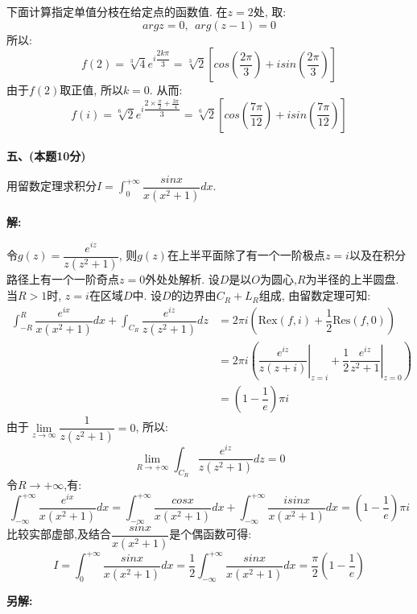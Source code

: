 \documentclass{article}
\begin{document}
下面计算指定单值分枝在给定点的函数值. 在$z=2$处, 取:
$$ argz = 0, \ \ arg(z-1) = 0 $$
所以:
$$ f(2) = \sqrt[3]{4} e^{i\dfrac{2k\pi}{3}} = \sqrt[3]{2}\left[cos(\dfrac{2\pi}{3}) + isin(\dfrac{2\pi}{3}) \right] $$
由于$f(2)$取正值, 所以$k=0$. 从而:
$$ f(i) = \sqrt[6]{2} e^{i\dfrac{2\times \frac{\pi}{2} + \frac{3\pi}{4}}{3}} = \sqrt[6]{2}\left[cos(\dfrac{7\pi}{12}) + isin(\dfrac{7\pi}{12})  \right] $$ \\ 


\textbf{五、(本题10分)}

用留数定理求积分$I = \displaystyle{\int_0^{+\infty} \dfrac{sinx}{x(x^2+1)}dx}$.

\textbf{解:}

令$g(z) = \dfrac{e^{iz}}{z(z^2+1)}$, 则$g(z)$在上半平面除了有一个一阶极点$z=i$以及在积分路径上有一个一阶奇点$z=0$外处处解析. 设$D$是以$O$为圆心,$R$为半径的上半圆盘. 当$R>1$时, $z=i$在区域$D$中. 设$D$的边界由$C_R + L_R$组成, 由留数定理可知:
\begin{align*}
 \displaystyle{\int_{-R}^{R} \dfrac{e^{ix}}{x(x^2+1)}dx} + \displaystyle{\int_{C_R} \dfrac{e^{iz}}{z(z^2+1)}dz} &= 2\pi i \left(\text{Rex}(f,i) + \dfrac{1}{2}\text{Res}(f,0)\right) \\
    &= 2\pi i \left( \left.\dfrac{e^{iz}}{z(z+i)} \right|_{z=i} +  \left. \dfrac{1}{2} \dfrac{e^{iz}}{z^2+1} \right|_{z=0} \right) \\
    &= \left(1-\dfrac{1}{e} \right)\pi i 
\end{align*}
由于$\lim\limits_{z \rightarrow \infty} \dfrac{1}{z(z^2+1)} = 0$, 所以:
$$ \lim\limits_{R \rightarrow +\infty} \displaystyle{\int_{C_R} \dfrac{e^{iz}}{z(z^2 + 1)}dz} = 0 $$
令$R \rightarrow +\infty$,有:
$$\displaystyle{\int_{-\infty}^{+\infty} \dfrac{e^{ix}}{x(x^2+1)}dx} = \displaystyle{\int_{-\infty}^{+\infty} \dfrac{cosx}{x(x^2+1)}dx} + \displaystyle{\int_{-\infty}^{+\infty} \dfrac{isinx}{x(x^2+1)}dx}=\left(1 -\dfrac{1}{e}\right)\pi i $$
比较实部虚部,及结合$\dfrac{sinx}{x(x^2+1)}$是个偶函数可得:
$$ I = \displaystyle{\int_0^{+\infty} \dfrac{sinx}{x(x^2+1)}dx} = \dfrac{1}{2}\displaystyle{\int_{-\infty}^{+\infty} \dfrac{sinx}{x(x^2+1)}dx} = \dfrac{\pi}{2}\left(1 - \dfrac{1}{e}\right) $$  

\textbf{另解:}
\end{document}
